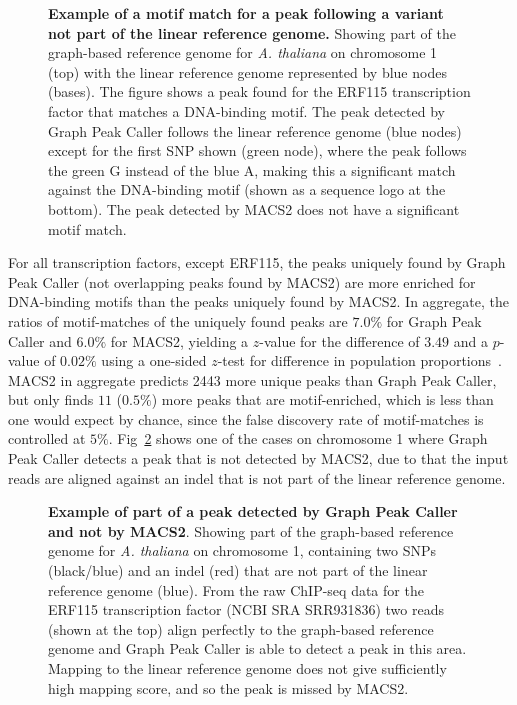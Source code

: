\documentclass[10pt,letterpaper]{article}
\begin{document}
\begin{figure}[H] %
 \caption{{\bf Example of a motif match for a peak following a variant not part of the linear reference genome.} Showing part of the graph-based reference genome for \emph{A. thaliana} on chromosome 1 (top) with the linear reference genome represented by blue nodes (bases). The figure shows a peak found for the ERF115 transcription
factor that matches a DNA-binding motif. The peak detected by Graph Peak Caller follows the linear reference genome (blue nodes) except for the first SNP shown (green node), where the peak follows the green G instead of the blue A, making this a significant match against the DNA-binding motif (shown as a sequence logo at the bottom). The peak detected by MACS2 does not have a significant motif match.}
\label{motif_enrichment}
\end{figure}


For all transcription factors, except ERF115, the peaks uniquely found by Graph Peak Caller (not overlapping peaks found by MACS2) are more enriched for DNA-binding motifs than the peaks uniquely found by MACS2. In aggregate, the ratios of motif-matches of the uniquely found peaks are $7.0\%$ for Graph Peak Caller and $6.0\%$ for MACS2, yielding a $z$-value for the difference of $3.49$ and a $p$-value of $0.02\%$ using a one-sided $z$-test for difference in population proportions~\cite{devoreberk}. MACS2 in aggregate predicts 2443 more unique peaks than Graph Peak Caller, but only finds $11$ ($0.5\%$) more peaks that are motif-enriched, which is less than one would expect by chance, since the false discovery rate of motif-matches is controlled at $5\%$. Fig~\ref{motif_enrichment_reads} shows one of the cases on chromosome 1 where Graph Peak Caller detects a peak that is not detected by MACS2, due to that the input reads are aligned against an indel that is not part of the linear reference genome. 


\begin{figure}[h!]
 \caption{{\bf Example of part of a peak detected by Graph Peak Caller and not by MACS2}. Showing part of the graph-based reference genome for \emph{A. thaliana} on chromosome 1, containing two SNPs (black/blue) and an indel (red) that are not part of the linear reference genome (blue).
   From the raw ChIP-seq data for the ERF115 transcription factor (NCBI SRA SRR931836) two reads (shown at the top) align perfectly to the graph-based reference genome and Graph Peak Caller is able to detect a peak in this area.
   Mapping to the linear reference genome does not give sufficiently high mapping score, and so the peak is missed by MACS2. }

\label{motif_enrichment_reads}
\end{figure}
\end{document}
